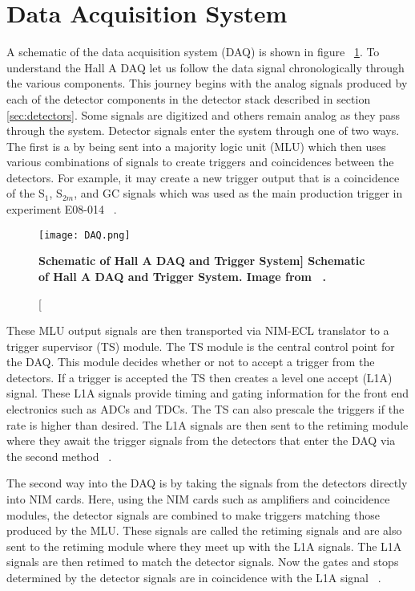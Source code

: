 \section{Data Acquisition System}
\label{sec:daq}

A schematic of the data acquisition system (DAQ) is shown in figure ~\ref{fig:daq}. To understand the Hall A DAQ let us follow the data signal chronologically through the various components. This journey begins with the analog signals produced by each of the detector components in the detector stack described in section \ref{sec:detectors}. Some signals are digitized and others remain analog as they pass through the system. Detector signals enter the system through one of two ways. The first is a by being sent into a majority logic unit (MLU) which then uses various combinations of signals to create triggers and coincidences between the detectors. For example, it may create a new trigger output that is a coincidence of the S$_1$, S$_{2m}$, and GC signals which was used as the main production trigger in experiment E08-014 ~\cite{DAQ}. 

\begin{figure}[!ht]
\begin{center}
\texttt{[image: DAQ.png]}
\end{center}
\caption[\bf{Schematic of Hall A DAQ and Trigger System}]{
{\bf{Schematic of Hall A DAQ and Trigger System.}} Image from ~\cite{DAQ}.}
\label{fig:daq}
\end{figure}

These MLU output signals are then transported via NIM-ECL translator to a trigger supervisor (TS) module. The TS module is the central control point for the DAQ. This module decides whether or not to accept a trigger from the detectors. If a trigger is accepted the TS then creates a level one accept (L1A) signal. These L1A signals provide timing and gating information for the front end electronics such as ADCs and TDCs. The TS can also prescale the triggers if the rate is higher than desired. The L1A signals are then sent to the retiming module where they await the trigger signals from the detectors that enter the DAQ via the second method ~\cite{DAQ}.

The second way into the DAQ is by taking the signals from the detectors directly into NIM cards. Here, using the NIM cards such as amplifiers and coincidence modules, the detector signals are combined to make triggers matching those produced by the MLU. These signals are called the retiming signals and are also sent to the retiming module where they meet up with the L1A signals. The L1A signals are then retimed to match the detector signals. Now the gates and stops determined by the detector signals are in coincidence with the L1A signal ~\cite{DAQ}.

